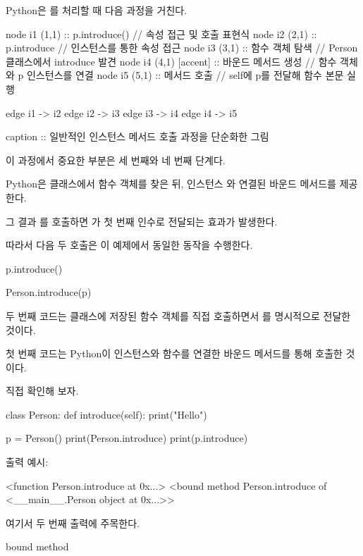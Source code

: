 Python은 를 처리할 때 다음 과정을 거친다.

\begin{dhkgraph}[uniform]
node i1 (1,1) :: p.introduce() // 속성 접근 및 호출 표현식
node i2 (2,1) :: p.introduce // 인스턴스를 통한 속성 접근
node i3 (3,1) :: 함수 객체 탐색 // Person 클래스에서 introduce 발견
node i4 (4,1) [accent] :: 바운드 메서드 생성 // 함수 객체와 p 인스턴스를 연결
node i5 (5,1) :: 메서드 호출 // self에 p를 전달해 함수 본문 실행

edge i1 -> i2
edge i2 -> i3
edge i3 -> i4
edge i4 -> i5

caption :: 일반적인 인스턴스 메서드 호출 과정을 단순화한 그림
\end{dhkgraph}

이 과정에서 중요한 부분은 세 번째와 네 번째 단계다.

Python은 클래스에서  함수 객체를 찾은 뒤, 인스턴스 와 연결된 바운드 메서드를 제공한다.

그 결과 를 호출하면 가 첫 번째 인수로 전달되는 효과가 발생한다.

따라서 다음 두 호출은 이 예제에서 동일한 동작을 수행한다.

\begin{dhkcode}
p.introduce()

Person.introduce(p)
\end{dhkcode}

두 번째 코드는 클래스에 저장된 함수 객체를 직접 호출하면서 를 명시적으로 전달한 것이다.

첫 번째 코드는 Python이 인스턴스와 함수를 연결한 바운드 메서드를 통해 호출한 것이다.

직접 확인해 보자.

\begin{dhkcode}
class Person:
    def introduce(self):
        print("Hello")

p = Person()
print(Person.introduce)
print(p.introduce)
\end{dhkcode}

출력 예시:

\begin{dhkzsh}
<function Person.introduce at 0x...>
<bound method Person.introduce of <__main__.Person object at 0x...>>
\end{dhkzsh}

여기서 두 번째 출력에 주목한다.

\begin{dhkzsh}
bound method
\end{dhkzsh}

